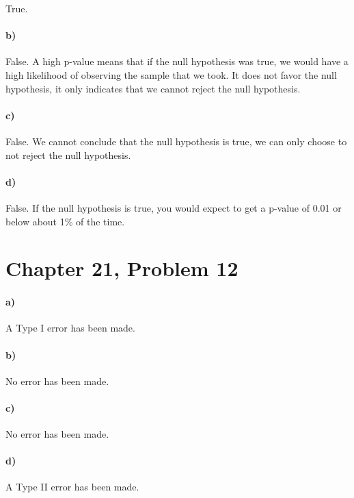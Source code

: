 \documentclass[12pt]{article}
\begin{document}
True.

\paragraph{b)}

False. A high p-value means that if the null hypothesis was true,
we would have a high likelihood of observing the sample that we took. It
does not favor the null hypothesis, it only indicates that we cannot reject
the null hypothesis.

\paragraph{c)}

False. We cannot conclude that the null hypothesis is true, we can only choose
to not reject the null hypothesis.

\paragraph{d)}

False. If the null hypothesis is true, you would expect to get a p-value of 0.01
or below about 1\% of the time.

\section*{Chapter 21, Problem 12}

\paragraph{a)}

A Type I error has been made.

\paragraph{b)}

No error has been made.

\paragraph{c)}

No error has been made.

\paragraph{d)}

A Type II error has been made.
\end{document}
